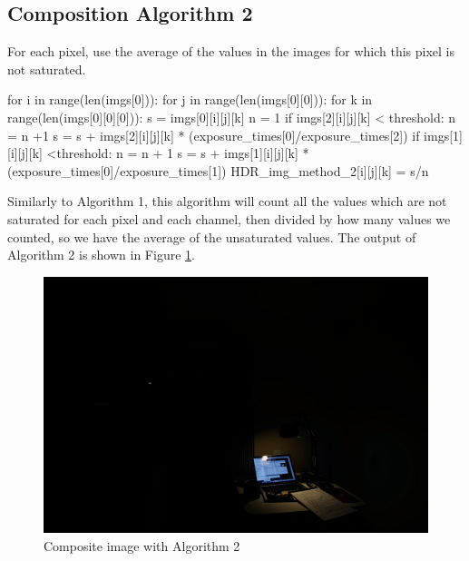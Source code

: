 \documentclass[10pt,twocolumn,letterpaper]{article}
\begin{document}
\subsection{Composition Algorithm 2}
For each pixel, use the average of the values in the images for which this pixel is not saturated. \\
\begin{python}
for i in  range(len(imgs[0])):
	for j in range(len(imgs[0][0])):
		for k in range(len(imgs[0][0][0])):
			s = imgs[0][i][j][k] 
			n = 1
			if imgs[2][i][j][k] < threshold:
				n = n +1
				s = s + imgs[2][i][j][k] 
				* (exposure_times[0]/exposure_times[2])
			if imgs[1][i][j][k] <threshold:
				n = n + 1
				s = s + imgs[1][i][j][k] 
				* (exposure_times[0]/exposure_times[1])
			HDR_img_method_2[i][j][k] = s/n
\end{python}

Similarly to Algorithm 1, this algorithm will count all the values which are not saturated for each pixel and each channel, then divided by how many values we counted, so we have the average of the unsaturated values. The output of Algorithm 2 is shown in Figure \ref{fig:HDR_img_method_2}.

\begin{figure}[bhp]
\includegraphics[width=\columnwidth]{images/hdr/combined/HDR_img_method_2}
\caption{Composite image with Algorithm 2}

\label{fig:HDR_img_method_2}
\end{figure}
\end{document}
